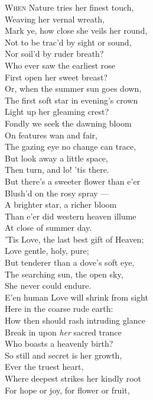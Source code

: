 \textsc{When} Nature tries her finest touch, \\
 Weaving her vernal wreath, \\
 Mark ye, how close she veils her round, \\
 Not to be trac’d by sight or sound, \\
 Nor soil’d by ruder breath? \\
  Who ever saw the earliest rose \\
 First open her sweet breast? \\
 Or, when the summer sun goes down, \\
 The first soft star in evening’s crown \\
 Light up her gleaming crest? \\
  Fondly we seek the dawning bloom \\
 On features wan and fair, \\
 The gazing eye no change can trace, \\
 But look away a little space, \\
 Then turn, and lo! ’tis there. \\
  But there’s a sweeter flower than e’er \\
 Blush’d on the rosy spray — \\
 A brighter star, a richer bloom \\
 Than e’er did western heaven illume \\
 At close of summer day. \\
  ’Tis Love, the last best gift of Heaven; \\
 Love gentle, holy, pure; \\
 But tenderer than a dove’s soft eye, \\
 The searching sun, the open sky, \\
 She never could endure. \\
  E’en human Love will shrink from sight \\
 Here in the coarse rude earth: \\
 How then should rash intruding glance \\
 Break in upon \emph{her} sacred trance \\
 Who boasts a heavenly birth? \\
  So still and secret is her growth, \\
 Ever the truest heart, \\
 Where deepest strikes her kindly root \\
 For hope or joy, for flower or fruit, \\
